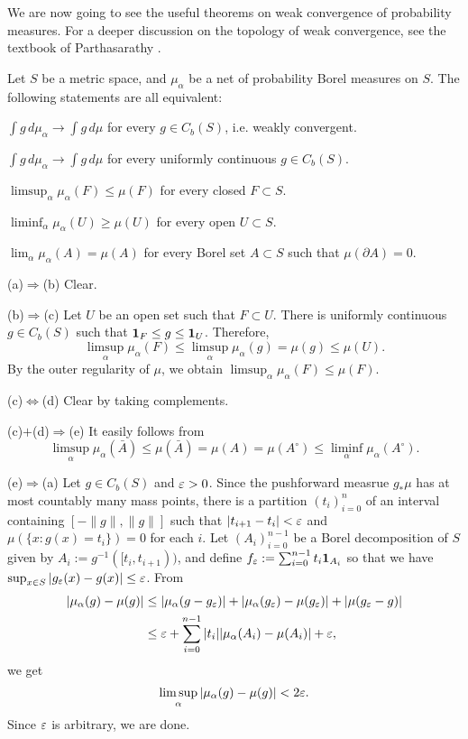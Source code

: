 \documentclass[a4paper]{article}
\begin{document}
We are now going to see the useful theorems on weak convergence of probability measures.
For a deeper discussion on the topology of weak convergence, see the textbook of Parthasarathy \cite{parthasarathy2005probability}.

\begin{lem}
Let $S$ be a metric space, and $\mu_\alpha$ be a net of probability Borel measures on $S$.
The following statements are all equivalent:
\begin{parts}
\item $\int g\,d\mu_\alpha\to\int g\,d\mu$ for every $g\in C_b(S)$, i.e. weakly convergent.
\item $\int g\,d\mu_\alpha\to\int g\,d\mu$ for every uniformly continuous $g\in C_b(S)$.
\item $\limsup_{\alpha}\mu_\alpha(F)\le\mu(F)$ for every closed $F\subset S$.
\item $\liminf_{\alpha}\mu_\alpha(U)\ge\mu(U)$ for every open $U\subset S$.
\item $\lim_{\alpha}\mu_\alpha(A)=\mu(A)$ for every Borel set $A\subset S$ such that $\mu(\partial A)=0$.
\end{parts}
\end{lem}
\begin{pf}
(a)$\Rightarrow$(b)
Clear.

(b)$\Rightarrow$(c)
Let $U$ be an open set such that $F\subset U$.
There is uniformly continuous $g\in C_b(S)$ such that $\mathbf{1}_F\le g\le\mathbf{1}_U$.
Therefore,
\[\limsup_\alpha\mu_\alpha(F)\le\limsup_\alpha\mu_\alpha(g)=\mu(g)\le\mu(U).\]
By the outer regularity of $\mu$, we obtain $\limsup_\alpha\mu_\alpha(F)\le\mu(F)$.

(c)$\Leftrightarrow$(d)
Clear by taking complements.

(c)$+$(d)$\Rightarrow$(e)
It easily follows from
\[\limsup_\alpha\mu_\alpha(\bar A)\le\mu(\bar A)=\mu(A)=\mu(A^\circ)\le\liminf_\alpha\mu_\alpha(A^\circ).\]

(e)$\Rightarrow$(a)
Let $g\in C_b(S)$ and $\varepsilon>0$.
Since the pushforward measrue $g_*\mu$ has at most countably many mass points, there is a partition $(t_i)_{i=0}^n$ of an interval containing $[-\|g\|,\|g\|]$ such that $|t_{i+1}-t_i|<\varepsilon$ and $\mu(\{x:g(x)=t_i\})=0$ for each $i$.
Let $(A_i)_{i=0}^{n-1}$ be a Borel decomposition of $S$ given by $A_i:=g^{-1}([t_i,t_{i+1}))$, and define $f_\varepsilon:=\sum_{i=0}^{n-1}t_i\mathbf{1}_{A_i}$ so that we have $\sup_{x\in S}|g_\varepsilon(x)-g(x)|\le\varepsilon$.
From
\begin{align*}
|\mu_\alpha(g)-\mu(g)|&\le|\mu_\alpha(g-g_\varepsilon)|+|\mu_\alpha(g_\varepsilon)-\mu(g_\varepsilon)|+|\mu(g_\varepsilon-g)|\\
&\le\varepsilon+\sum_{i=0}^{n-1}|t_i||\mu_\alpha(A_i)-\mu(A_i)|+\varepsilon,
\end{align*}
we get
\[\limsup_\alpha|\mu_\alpha(g)-\mu(g)|<2\varepsilon.\]
Since $\varepsilon$ is arbitrary, we are done.
\end{pf}
\end{document}
